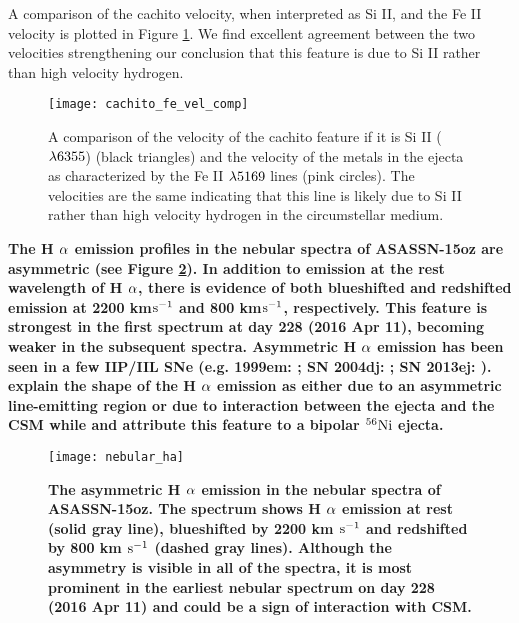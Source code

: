 \documentclass[a4paper,fleqn,usenatbib]{mnras}
\begin{document}
A comparison of the cachito velocity, when interpreted as Si II, and the Fe II velocity is plotted in Figure \ref{fig:SiVelocity}.
We find excellent agreement between the two velocities strengthening our conclusion that this feature is due to Si II rather than high velocity hydrogen.
\begin{figure}
\begin{center}
\texttt{[image: cachito\_fe\_vel\_comp]}
\caption{A comparison of the velocity of the cachito feature if it is Si II ($\rm{\lambda6355}$) (black triangles) and the velocity of the metals in the ejecta as characterized by the Fe II $\rm{\lambda5169}$ lines (pink circles).
The velocities are the same indicating that this line is likely due to Si II rather than high velocity hydrogen in the circumstellar medium.}
\label{fig:SiVelocity}
\end{center}
\end{figure}

\textbf{The H $\rm{\alpha}$ emission profiles in the nebular spectra of ASASSN-15oz are asymmetric (see Figure \ref{fig:nebHa}).
In addition to emission at the rest wavelength of H $\rm{\alpha}$, there is evidence of both blueshifted and redshifted emission at 2200 km$\rm{s^{-1}}$ and 800 km$\rm{s^{-1}}$, respectively. 
This feature is strongest in the first spectrum at day 228 (2016 Apr 11), becoming weaker in the subsequent spectra.
Asymmetric H $\rm{\alpha}$ emission has been seen in a few IIP/IIL SNe (e.g. 1999em: \citealt{2001leonard}; SN 2004dj: \citealt{2005chugai}; SN 2013ej: \citealt{2017utrobin}).
\citet{2001leonard} explain the shape of the H $\rm{\alpha}$ emission as either due to an asymmetric line-emitting region or due to interaction between the ejecta and the CSM while \citet{2005chugai} and \citet{2017utrobin} attribute this feature to a bipolar $\rm{^{56}Ni}$ ejecta. }

\begin{figure}
\begin{center}
\texttt{[image: nebular\_ha]} %
\caption{\textbf{The asymmetric H $\rm{\alpha}$ emission in the nebular spectra of ASASSN-15oz. 
The spectrum shows H $\rm{\alpha}$ emission at rest (solid gray line), blueshifted by 2200 km $\rm{s^{-1}}$ and redshifted by 800 km $\rm{s^{-1}}$ (dashed gray lines).
Although the asymmetry is visible in all of the spectra, it is most prominent in the earliest nebular spectrum on day 228 (2016 Apr 11) and could be a sign of interaction with CSM.
}}
\label{fig:nebHa}
\end{center}
\end{figure}
\end{document}
